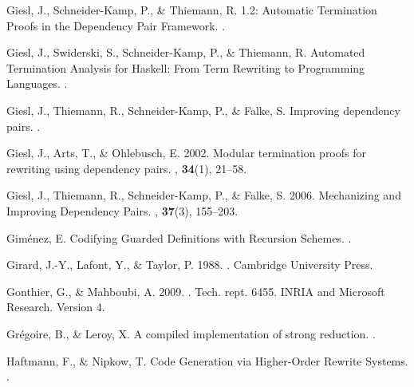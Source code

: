 \begin{thebibliography}{}
Giesl, J., Schneider-Kamp, P., \& Thiemann, R.
 1.2: Automatic Termination Proofs in the Dependency Pair
  Framework.
.

Giesl, J., Swiderski, S., Schneider-Kamp, P., \& Thiemann, R.
\newblock Automated Termination Analysis for {Haskell}: From Term Rewriting to
  Programming Languages.
.

Giesl, J., Thiemann, R., Schneider-Kamp, P., \& Falke, S.
\newblock Improving dependency pairs.
.

Giesl, J., Arts, T., \& Ohlebusch, E. 2002.
\newblock Modular termination proofs for rewriting using dependency pairs.
, {\bf 34}(1), 21--58.

Giesl, J., Thiemann, R., Schneider-Kamp, P., \& Falke, S. 2006.
\newblock Mechanizing and Improving Dependency Pairs.
, {\bf 37}(3), 155--203.

Gim{\'e}nez, E.
\newblock Codifying Guarded Definitions with Recursion Schemes.
.

Girard, J.-Y., Lafont, Y., \& Taylor, P. 1988.
.
\newblock Cambridge University Press.

Gonthier, G., \& Mahboubi, A. 2009.
.
\newblock Tech. rept. 6455. INRIA and Microsoft Research.
\newblock Version 4.

Gr{\'e}goire, B., \& Leroy, X.
\newblock A compiled implementation of strong reduction.
.

Haftmann, F., \& Nipkow, T.
\newblock Code Generation via Higher-Order Rewrite Systems.
.


\end{thebibliography}
